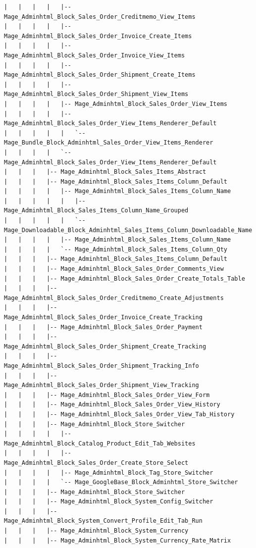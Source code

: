 \documentclass[oneside]{book}
\begin{document}
\begin{lstlisting}
|   |   |   |   |-- Mage_Adminhtml_Block_Sales_Order_Creditmemo_View_Items
|   |   |   |   |-- Mage_Adminhtml_Block_Sales_Order_Invoice_Create_Items
|   |   |   |   |-- Mage_Adminhtml_Block_Sales_Order_Invoice_View_Items
|   |   |   |   |-- Mage_Adminhtml_Block_Sales_Order_Shipment_Create_Items
|   |   |   |   |-- Mage_Adminhtml_Block_Sales_Order_Shipment_View_Items
|   |   |   |   |-- Mage_Adminhtml_Block_Sales_Order_View_Items
|   |   |   |   |-- Mage_Adminhtml_Block_Sales_Order_View_Items_Renderer_Default
|   |   |   |   |   `-- Mage_Bundle_Block_Adminhtml_Sales_Order_View_Items_Renderer
|   |   |   |   `-- Mage_Adminhtml_Block_Sales_Order_View_Items_Renderer_Default
|   |   |   |-- Mage_Adminhtml_Block_Sales_Items_Abstract
|   |   |   |-- Mage_Adminhtml_Block_Sales_Items_Column_Default
|   |   |   |   |-- Mage_Adminhtml_Block_Sales_Items_Column_Name
|   |   |   |   |   |-- Mage_Adminhtml_Block_Sales_Items_Column_Name_Grouped
|   |   |   |   |   `-- Mage_Downloadable_Block_Adminhtml_Sales_Items_Column_Downloadable_Name
|   |   |   |   |-- Mage_Adminhtml_Block_Sales_Items_Column_Name
|   |   |   |   `-- Mage_Adminhtml_Block_Sales_Items_Column_Qty
|   |   |   |-- Mage_Adminhtml_Block_Sales_Items_Column_Default
|   |   |   |-- Mage_Adminhtml_Block_Sales_Order_Comments_View
|   |   |   |-- Mage_Adminhtml_Block_Sales_Order_Create_Totals_Table
|   |   |   |-- Mage_Adminhtml_Block_Sales_Order_Creditmemo_Create_Adjustments
|   |   |   |-- Mage_Adminhtml_Block_Sales_Order_Invoice_Create_Tracking
|   |   |   |-- Mage_Adminhtml_Block_Sales_Order_Payment
|   |   |   |-- Mage_Adminhtml_Block_Sales_Order_Shipment_Create_Tracking
|   |   |   |-- Mage_Adminhtml_Block_Sales_Order_Shipment_Tracking_Info
|   |   |   |-- Mage_Adminhtml_Block_Sales_Order_Shipment_View_Tracking
|   |   |   |-- Mage_Adminhtml_Block_Sales_Order_View_Form
|   |   |   |-- Mage_Adminhtml_Block_Sales_Order_View_History
|   |   |   |-- Mage_Adminhtml_Block_Sales_Order_View_Tab_History
|   |   |   |-- Mage_Adminhtml_Block_Store_Switcher
|   |   |   |   |-- Mage_Adminhtml_Block_Catalog_Product_Edit_Tab_Websites
|   |   |   |   |-- Mage_Adminhtml_Block_Sales_Order_Create_Store_Select
|   |   |   |   |-- Mage_Adminhtml_Block_Tag_Store_Switcher
|   |   |   |   `-- Mage_GoogleBase_Block_Adminhtml_Store_Switcher
|   |   |   |-- Mage_Adminhtml_Block_Store_Switcher
|   |   |   |-- Mage_Adminhtml_Block_System_Config_Switcher
|   |   |   |-- Mage_Adminhtml_Block_System_Convert_Profile_Edit_Tab_Run
|   |   |   |-- Mage_Adminhtml_Block_System_Currency
|   |   |   |-- Mage_Adminhtml_Block_System_Currency_Rate_Matrix

\end{lstlisting}
\end{document}
